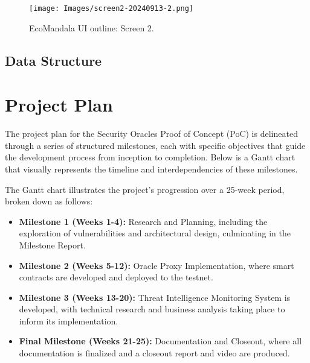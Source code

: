 \documentclass{scrreport}
\begin{document}
\begin{figure}[H]
\centering
\texttt{[image: Images/screen2-20240913-2.png]}
\caption{EcoMandala UI outline: Screen 2.}
\label{fig:ui-screen-2}
\end{figure}

\newpage
\subsection{Data Structure}


\newpage


\section{Project Plan}

The project plan for the Security Oracles Proof of Concept (PoC) is delineated through a series of structured milestones, each with specific objectives that guide the development process from inception to completion. Below is a Gantt chart that visually represents the timeline and interdependencies of these milestones.


The Gantt chart illustrates the project's progression over a 25-week period, broken down as follows:

\begin{itemize}
  \item \textbf{Milestone 1 (Weeks 1-4):} Research and Planning, including the exploration of vulnerabilities and architectural design, culminating in the Milestone Report.
  \item \textbf{Milestone 2 (Weeks 5-12):} Oracle Proxy Implementation, where smart contracts are developed and deployed to the testnet.
  \item \textbf{Milestone 3 (Weeks 13-20):} Threat Intelligence Monitoring System is developed, with technical research and business analysis taking place to inform its implementation.
  \item \textbf{Final Milestone (Weeks 21-25):} Documentation and Closeout, where all documentation is finalized and a closeout report and video are produced.
\end{itemize}
\end{document}
